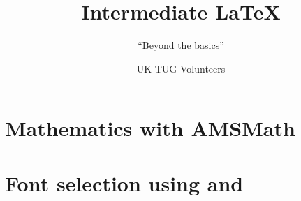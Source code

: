 \usepackage[T1]{fontenc}
\usepackage{babel,booktabs,csquotes,lmodern,tikz,verbatim}

\newcommand*{\BibTeX}{BibTeX}
\newcommand*{\cls}[1]{\textsf{#1}}
\newcommand*{\cs}[1]{\texttt{\char`\\#1}}
\newcommand*{\marg}[1]{\texttt{\char`\{#1\char`\}}}
\newcommand*{\meta}[1]{\ensuremath{\langle}\emph{#1}\ensuremath{\rangle}}
\newcommand*{\oarg}[1]{\texttt{[#1]}}
\newcommand*{\pkg}[1]{\textsf{#1}}

\renewcommand*{\LaTeX}{LaTeX}
\renewcommand*{\LaTeXe}{LaTeX2e}
\renewcommand*{\TeX}{TeX}

\title{Intermediate \LaTeX{}}
\subtitle{\enquote{Beyond the basics}}
\author{UK-TUG Volunteers}



\begin{frame}
  \titlepage
\end{frame}



\section{Mathematics with AMSMath}

\section{Font selection using \XeTeX{} and \LuaTeX{}}

